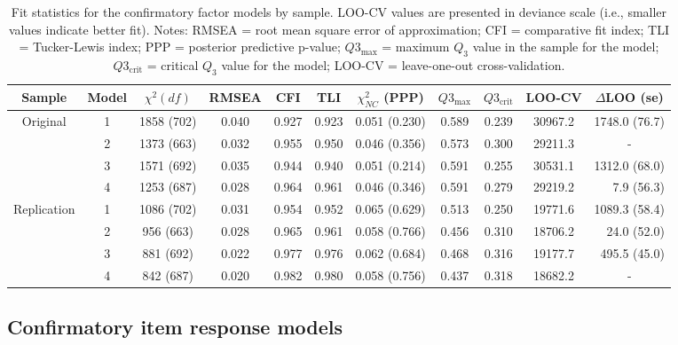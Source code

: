 \documentclass[letterpaper,man,natbib,longtable,floatsintext,12pt]{apa6}
\begin{document}
\begin{table}[t!]
\small
\centering
\begin{adjustbox}{center}
\begin{tabular}{ccccccccccr}
\toprule
Sample & Model & $\chi^2 (df)$ &  RMSEA & CFI & TLI & $\chi^2_{NC}$ (PPP) & $Q3_{\max}$ &  $Q3_{\text{crit}}$ & LOO-CV & \multicolumn{1}{c}{$\Delta$LOO (se)} \\
\midrule
Original & 1 &  1858 (702) &  0.040 &  0.927 &  0.923 &  0.051 (0.230) &  0.589 &  0.239 &  30967.2 &  1748.0 (76.7) \\
& 2 &  1373 (663) &  0.032 &  0.955 &  0.950 &  0.046 (0.356) &  0.573 &  0.300 &  29211.3 & \multicolumn{1}{c}{-} \\
& 3 &  1571 (692) &  0.035 &  0.944 &  0.940 &  0.051 (0.214) &  0.591 &  0.255 &  30531.1 &  1312.0 (68.0) \\
& 4 &  1253 (687) &  0.028 &  0.964 &  0.961 &  0.046 (0.346) &  0.591 &  0.279 &  29219.2 & 7.9 (56.3) \\
\midrule
Replication & 1 &  1086 (702) &  0.031 &  0.954 &  0.952 &  0.065 (0.629) &  0.513 &  0.250 &  19771.6 &  1089.3 (58.4) \\
& 2 &   956 (663) &  0.028 &  0.965 &  0.961 &  0.058 (0.766) &  0.456 &  0.310 &  18706.2 &    24.0 (52.0) \\
& 3 &   881 (692) &  0.022 &  0.977 &  0.976 &  0.062 (0.684) &  0.468 &  0.316 &  19177.7 &   495.5 (45.0) \\
& 4 &   842 (687) &  0.020 &  0.982 &  0.980 &  0.058 (0.756) &  0.437 &  0.318 &  18682.2 & \multicolumn{1}{c}{-} \\
\bottomrule
\end{tabular}
\end{adjustbox}
\captionsetup{width=1\textwidth}
\caption{\normalfont Fit statistics for the confirmatory factor models by sample. LOO-CV values are presented in deviance scale (i.e., smaller values indicate better fit). Notes: RMSEA = root mean square error of approximation; CFI = comparative fit index; TLI = Tucker-Lewis index; PPP = posterior predictive p-value; $Q3_{\max}$ = maximum $Q_3$ value in the sample for the model; $Q3_{\text{crit}}$ = critical $Q_3$ value for the model; LOO-CV = leave-one-out cross-validation.}
\label{table:cfa_diagnostics}
\end{table}

\subsection{Confirmatory item response models}
\end{document}
